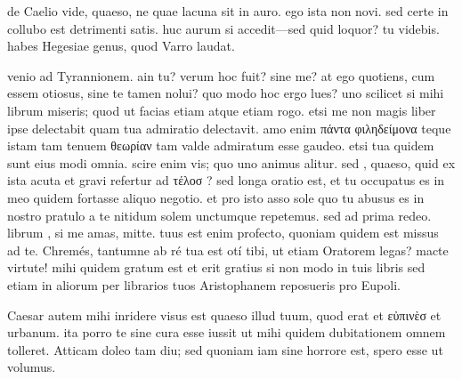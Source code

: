 


 de Caelio vide, quaeso, ne quae lacuna sit in auro. ego ista non novi. sed certe in collubo est detrimenti satis. huc aurum si accedit—sed quid loquor? tu videbis. habes Hegesiae genus, quod Varro laudat.

 venio ad Tyrannionem. ain tu? verum hoc fuit? sine me? at ego quotiens, cum essem otiosus, sine te tamen nolui? quo modo hoc ergo lues? uno scilicet si mihi librum miseris; quod ut facias etiam atque etiam rogo. etsi me non magis liber ipse delectabit quam tua admiratio delectavit. amo enim πάντα φιληδείμονα teque istam tam tenuem θεωρίαν tam valde admiratum esse gaudeo. etsi tua quidem sunt eius modi omnia. scire enim vis; quo uno animus alitur. sed , quaeso, quid ex ista acuta et gravi refertur ad τέλοσ ? sed longa oratio est, et tu occupatus es in meo quidem fortasse aliquo negotio. et pro isto asso sole quo tu abusus es in nostro pratulo a te nitidum solem unctumque repetemus. sed ad prima redeo. librum , si me amas, mitte. tuus est enim profecto, quoniam quidem est missus ad te. Chremés, tantumne ab ré tua est otí tibi, ut etiam Oratorem legas? macte virtute! mihi quidem gratum est et erit gratius si non modo in tuis libris sed etiam in aliorum per librarios tuos Aristophanem reposueris pro Eupoli.

 Caesar autem mihi inridere visus est quaeso illud tuum, quod erat et εὐπινὲσ et urbanum. ita porro te sine cura esse iussit ut mihi quidem dubitationem omnem tolleret. Atticam doleo tam diu; sed quoniam iam sine horrore est, spero esse ut volumus.
